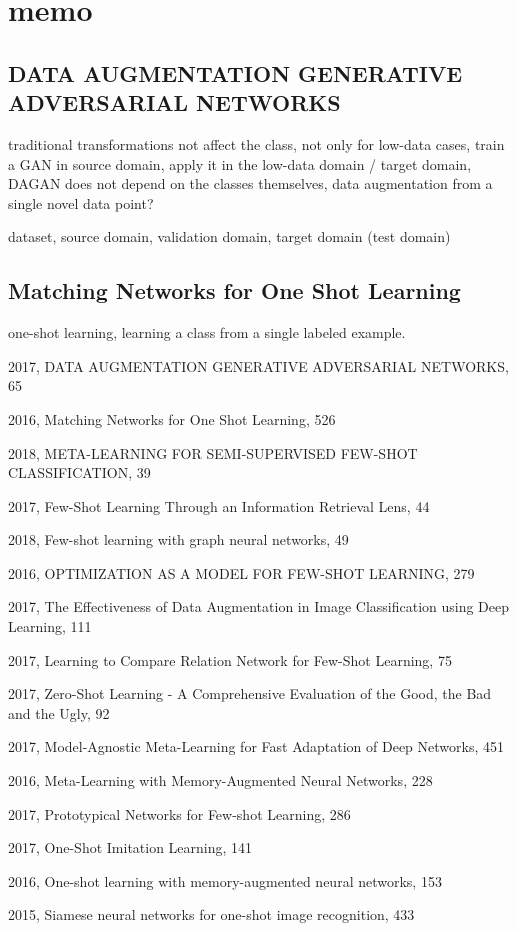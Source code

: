 \documentclass{article}
\begin{document}
\section{memo}

\subsection*{DATA AUGMENTATION GENERATIVE ADVERSARIAL NETWORKS}

traditional transformations not affect the class, not only for low-data cases, train a GAN in source domain, apply it in the low-data domain / target domain, DAGAN does not depend on the classes themselves, data augmentation from a single novel data point?

dataset, source domain, validation domain, target domain (test domain)



\subsection*{Matching Networks for One Shot Learning} 

one-shot learning, learning a class from a single labeled example.

2017, DATA AUGMENTATION GENERATIVE ADVERSARIAL NETWORKS, 65

2016, Matching Networks for One Shot Learning, 526

2018, META-LEARNING FOR SEMI-SUPERVISED FEW-SHOT CLASSIFICATION, 39

2017, Few-Shot Learning Through an Information Retrieval Lens, 44

2018, Few-shot learning with graph neural networks, 49

2016, OPTIMIZATION AS A MODEL FOR FEW-SHOT LEARNING, 279

2017, The Effectiveness of Data Augmentation in Image Classification using Deep Learning, 111

2017, Learning to Compare Relation Network for Few-Shot Learning, 75

2017, Zero-Shot Learning - A Comprehensive Evaluation of the Good, the Bad and the Ugly, 92

2017, Model-Agnostic Meta-Learning for Fast Adaptation of Deep Networks, 451

2016, Meta-Learning with Memory-Augmented Neural Networks, 228

2017, Prototypical Networks for Few-shot Learning, 286

2017, One-Shot Imitation Learning, 141

2016, One-shot learning with memory-augmented neural networks, 153

2015, Siamese neural networks for one-shot image recognition, 433





\end{document}
